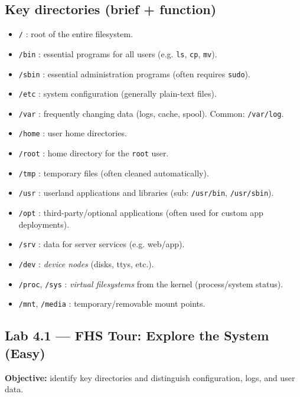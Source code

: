 \subsection*{Key directories (brief + function)}
\begin{itemize}
    \item \texttt{/} : root of the entire filesystem.
    \item \texttt{/bin} : essential programs for all users (e.g. \texttt{ls}, \texttt{cp}, \texttt{mv}).
    \item \texttt{/sbin} : essential administration programs (often requires \texttt{sudo}).
    \item \texttt{/etc} : system configuration (generally plain-text files).
    \item \texttt{/var} : frequently changing data (logs, cache, spool). Common: \texttt{/var/log}.
    \item \texttt{/home} : user home directories.
    \item \texttt{/root} : home directory for the \texttt{root} user.
    \item \texttt{/tmp} : temporary files (often cleaned automatically).
    \item \texttt{/usr} : userland applications and libraries (sub: \texttt{/usr/bin}, \texttt{/usr/sbin}).
    \item \texttt{/opt} : third-party/optional applications (often used for custom app deployments).
    \item \texttt{/srv} : data for server services (e.g. web/app).
    \item \texttt{/dev} : \textit{device nodes} (disks, ttys, etc.).
    \item \texttt{/proc}, \texttt{/sys} : \textit{virtual filesystems} from the kernel (process/system status).
    \item \texttt{/mnt}, \texttt{/media} : temporary/removable mount points.
\end{itemize}

\subsection*{Lab 4.1 --- FHS Tour: Explore the System (Easy)}
\textbf{Objective:} identify key directories and distinguish configuration,
logs, and user data.

